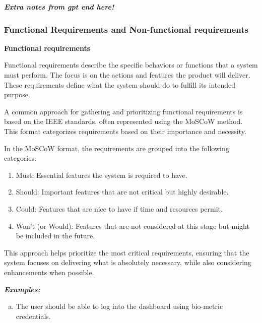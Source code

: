 \documentclass[a4paper]{article}
\begin{document}
\textbf{\textit{Extra notes from gpt end here! }}

\vspace{0.5 cm}
\subsubsection{\textbf{Functional Requirements and Non-functional requirements}}

\vspace{0.5 cm}
\begin{Large}\textbf{Functional requirements }\end{Large}

Functional requirements describe the specific behaviors or functions that a system must perform. 
The focus is on the actions and features the product will deliver. These requirements define what the system should do 
to fulfill its intended purpose.

A common approach for gathering and prioritizing functional requirements is based on the IEEE standards, often represented using 
the MoSCoW method. This format categorizes requirements based on their importance and necessity.

In the MoSCoW format, the requirements are grouped into the following categories:

\begin{enumerate}
    \item Must: Essential features the system is required to have. 
    \item Should: Important features that are not critical but highly desirable. 
    \item Could: Features that are nice to have if time and resources permit. 
    \item Won't (or Would): Features that are not considered at this stage but might be included in the future. 
\end{enumerate}

This approach helps prioritize the most critical requirements, ensuring that the system focuses on delivering what is absolutely necessary, 
while also considering enhancements when possible.

\textbf{\textit{Examples:}} 
    \begin{enumerate}[(a)]
        \item The user should be able to log into the dashboard using bio-metric credentials.  
    \end{enumerate}
\vspace{0.5 cm}
\end{document}
